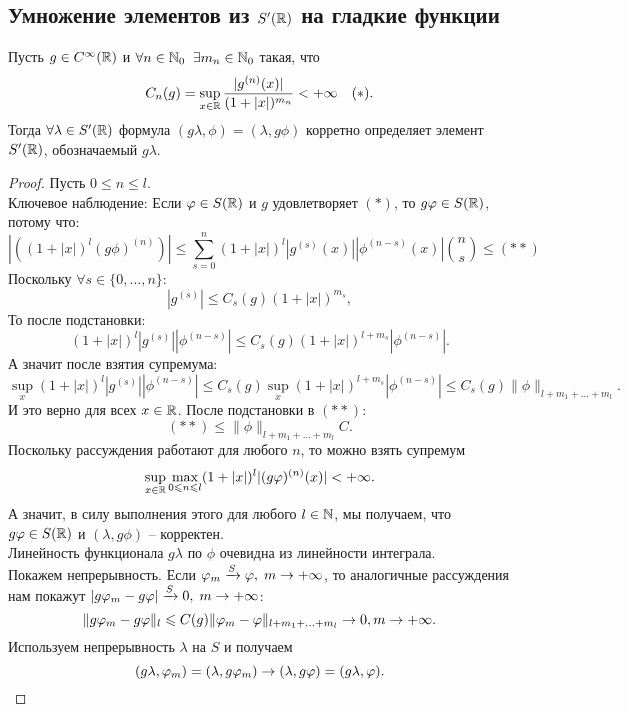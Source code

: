 \subsection{Умножение элементов из $S'(\mathbb{R})$ на гладкие функции}
\begin{lemma}
    Пусть $g \in C^\infty(\mathbb{R})$ и $\forall n \in \mathbb{N}_0 \;\; \exists m_n \in \mathbb{N}_0$ такая, что
    \[
        C_n(g) = \sup\limits_{x \in \mathbb{R}} \dfrac{|g^{(n)}(x)|}{(1 + |x|)^{m_n}} < +\infty \quad (*).
    \]
    Тогда $\forall \lambda \in S'(\mathbb{R})$ формула $(g \lambda, \phi) = (\lambda, g\phi)$ корретно определяет элемент $S'(\mathbb{R})$, обозначаемый $g\lambda$.
\end{lemma}
\begin{proof}
    Пусть $0 \leq n \leq l$. \\
    Ключевое наблюдение: Если $\varphi \in S(\mathbb{R})$ и $g$ удовлетворяет $(*)$, то $g\varphi \in S(\mathbb{R})$, потому что:
    \[
        |((1 + |x|)^l (g\phi)^{(n)})| \leq \sum\limits_{s = 0}^n (1 + |x|)^l |g^{(s)}(x)||\phi^{(n - s)}(x)| \binom{n}{s} \leq (**)
    \]
    Поскольку $\forall s \in \{0, \ldots, n\}$:
    \[
        |g^{(s)}| \leq C_s(g)(1 + |x|)^{m_s},
    \]
    То после подстановки:
    \[
        (1 + |x|)^l |g^{(s)}||\phi^{(n - s)}| \leq C_s(g)(1 + |x|)^{l + m_s}|\phi^{(n - s)}|.
    \]
    А значит после взятия супремума:
    \[
        \sup \limits_x (1 + |x|)^l |g^{(s)}||\phi^{(n - s)}| \leq C_s(g) \sup \limits_x (1 + |x|)^{l + m_s}|\phi^{(n - s)}| \leq C_s(g)\|\phi\|_{l + m_1 + \ldots + m_l}.
    \]
    И это верно для всех $x \in \mathbb{R}$.
    После подстановки в $(**)$:
    \[
        (**) \leq \|\phi\|_{l + m_1 + \ldots + m_l} C.
    \]
    Поскольку рассуждения работают для любого $n$, то можно взять супремум
    \[
        \sup\limits_{x \in \mathbb{R}} \max\limits_{0 \leqslant n \leqslant l} (1 + |x|)^l |(g \varphi)^{(n)}(x)| < +\infty.
    \]
    А значит, в силу выполнения этого для любого $l \in \mathbb{N}$, мы получаем, что $g\varphi \in S(\mathbb{R})$ и $(\lambda, g\phi)$ -- корректен. \\
    Линейность функционала $g\lambda$ по $\phi$ очевидна из линейности интеграла. \\
    Покажем непрерывность.
    Если $\varphi_m \xrightarrow{S} \varphi, \; m \rightarrow +\infty$, то аналогичные рассуждения нам покажут $|g\varphi_m - g\varphi| \xrightarrow{S} 0, \; m \rightarrow +\infty$:
    \[
        \|g\varphi_m - g\varphi\|_l \leqslant C(g)\|\varphi_m - \varphi\|_{l + m_1 + \ldots + m_l} \rightarrow 0, m \rightarrow +\infty.
    \]
    Используем непрерывность $\lambda$ на $S$ и получаем
    \[
        (g\lambda, \varphi_m) = (\lambda, g\varphi_m) \rightarrow (\lambda, g\varphi) = (g\lambda, \varphi).
    \]
\end{proof}
